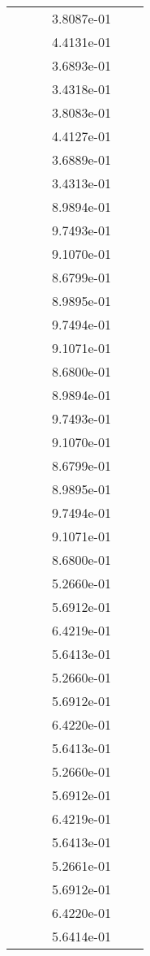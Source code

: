 \begin{xltabular}{\textwidth}{r|rS[table-format=1.3e+2]S[table-format=1.4e+2]S[table-format=1.4e+2]S[table-format=-1.5]}
&  &  & 3.8087e-01 & & \\
&  &  & 4.4131e-01 & & \\
&  &  & 3.6893e-01 & & \\
&  &  & 3.4318e-01 & & \\
&  &  & 3.8083e-01 & & \\
&  &  & 4.4127e-01 & & \\
&  &  & 3.6889e-01 & & \\
&  &  & 3.4313e-01 & & \\
&  &  & 8.9894e-01 & & \\
&  &  & 9.7493e-01 & & \\
&  &  & 9.1070e-01 & & \\
&  &  & 8.6799e-01 & & \\
&  &  & 8.9895e-01 & & \\
&  &  & 9.7494e-01 & & \\
&  &  & 9.1071e-01 & & \\
&  &  & 8.6800e-01 & & \\
&  &  & 8.9894e-01 & & \\
&  &  & 9.7493e-01 & & \\
&  &  & 9.1070e-01 & & \\
&  &  & 8.6799e-01 & & \\
&  &  & 8.9895e-01 & & \\
&  &  & 9.7494e-01 & & \\
&  &  & 9.1071e-01 & & \\
&  &  & 8.6800e-01 & & \\
&  &  & 5.2660e-01 & & \\
&  &  & 5.6912e-01 & & \\
&  &  & 6.4219e-01 & & \\
&  &  & 5.6413e-01 & & \\
&  &  & 5.2660e-01 & & \\
&  &  & 5.6912e-01 & & \\
&  &  & 6.4220e-01 & & \\
&  &  & 5.6413e-01 & & \\
&  &  & 5.2660e-01 & & \\
&  &  & 5.6912e-01 & & \\
&  &  & 6.4219e-01 & & \\
&  &  & 5.6413e-01 & & \\
&  &  & 5.2661e-01 & & \\
&  &  & 5.6912e-01 & & \\
&  &  & 6.4220e-01 & & \\
&  &  & 5.6414e-01 & & \\

\end{xltabular}

